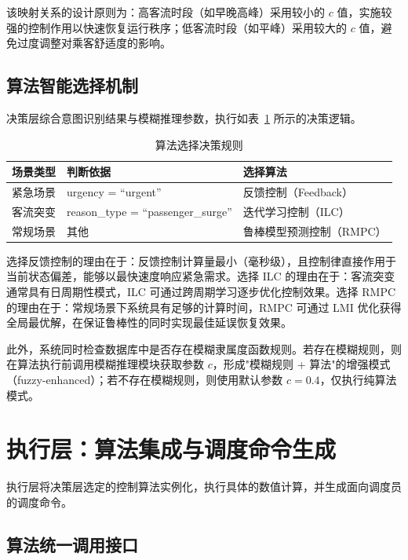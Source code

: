 该映射关系的设计原则为：高客流时段（如早晚高峰）采用较小的 $c$ 值，实施较强的控制作用以快速恢复运行秩序；低客流时段（如平峰）采用较大的 $c$ 值，避免过度调整对乘客舒适度的影响。

\subsection{算法智能选择机制}

决策层综合意图识别结果与模糊推理参数，执行如表~\ref{tab:decision_rules} 所示的决策逻辑。

\begin{table}
    \centering
    \caption{算法选择决策规则}
    \label{tab:decision_rules}
    \begin{tabular}{cll}
        \hline
        场景类型 & 判断依据 & 选择算法 \\
        \hline
        紧急场景 & urgency = ``urgent'' & 反馈控制（Feedback） \\
        客流突变 & reason\_type = ``passenger\_surge'' & 迭代学习控制（ILC） \\
        常规场景 & 其他 & 鲁棒模型预测控制（RMPC） \\
        \hline
    \end{tabular}
\end{table}

选择反馈控制的理由在于：反馈控制计算量最小（毫秒级），且控制律直接作用于当前状态偏差，能够以最快速度响应紧急需求。选择 ILC 的理由在于：客流突变通常具有日周期性模式，ILC 可通过跨周期学习逐步优化控制效果。选择 RMPC 的理由在于：常规场景下系统具有足够的计算时间，RMPC 可通过 LMI 优化获得全局最优解，在保证鲁棒性的同时实现最佳延误恢复效果。

此外，系统同时检查数据库中是否存在模糊隶属度函数规则。若存在模糊规则，则在算法执行前调用模糊推理模块获取参数 $c$，形成"模糊规则 + 算法"的增强模式（fuzzy-enhanced）；若不存在模糊规则，则使用默认参数 $c = 0.4$，仅执行纯算法模式。

\section{执行层：算法集成与调度命令生成}
\label{agent:sec5}

执行层将决策层选定的控制算法实例化，执行具体的数值计算，并生成面向调度员的调度命令。

\subsection{算法统一调用接口}

